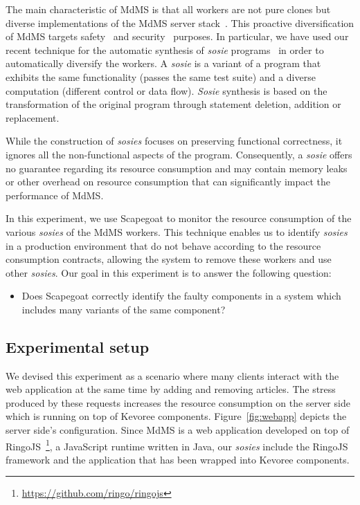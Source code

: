 The main characteristic of MdMS is that all workers are not pure clones but diverse implementations of the MdMS server stack~\cite{alliermulti}.
This proactive diversification of MdMS targets safety~\cite{avizienis85} and security~\cite{Forrest97} purposes.
In particular, we have used our recent technique for the automatic synthesis of \textit{sosie} programs~\cite{baudry2014tailored} in order to automatically diversify the workers. 
A \textit{sosie} is a variant of a program that exhibits the same functionality (passes the same test suite) and a diverse computation (different control or data flow). 
\textit{Sosie} synthesis is based on the transformation of the original program through statement deletion, addition or replacement.

While the construction of \textit{sosies} focuses on preserving functional correctness, it ignores all the non-functional aspects of the program.
Consequently, a \textit{sosie} offers no guarantee regarding its resource consumption and may contain memory leaks or other overhead on resource consumption that can significantly impact the performance of MdMS.

In this experiment, we use Scapegoat to monitor the resource consumption of the various \textit{sosies} of the MdMS workers.
This technique enables us to identify \textit{sosies} in a production environment that do not behave according to the resource consumption contracts, allowing the system to remove these workers and use other \textit{sosies}.
Our goal in this experiment is to answer the following question:

\begin{itemize}
 \item Does Scapegoat correctly identify the faulty components in a system which includes many variants of the same component?   
\end{itemize}

\subsection{Experimental setup}

We devised this experiment as a scenario where many clients interact with the web application at the same time by adding and removing articles.
The stress produced by these requests increases the resource consumption on the server side which is running on top of Kevoree components.
Figure~\ref{fig:webapp} depicts the server side's configuration.
Since MdMS is a web application developed on top of RingoJS~\footnote{\url{https://github.com/ringo/ringojs}}, a JavaScript runtime written in Java, our \textit{sosies} include the RingoJS framework and the application that has been wrapped into Kevoree components.

